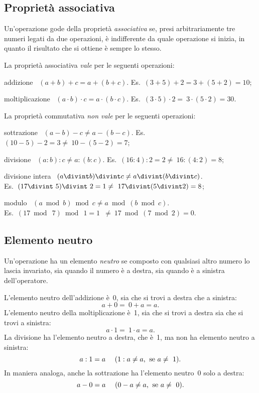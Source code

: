 \subsection{Proprietà associativa}
Un'operazione gode della proprietà \emph{associativa} se, presi arbitrariamente tre numeri legati da due operazioni,
è indifferente da quale operazione si inizia, in quanto il risultato che si ottiene è sempre lo stesso.

La proprietà associativa \emph{vale} per le seguenti operazioni:
\begin{description*}
 \item[addizione]~$(a+b)+c=a+(b+c)$. \quad Es.~$(3+5)+2=3+(5+2)=10$;
 \item[moltiplicazione]~$(a\cdot b)\cdot c=a\cdot (b\cdot c)$. \quad Es.~$(3\cdot 5)\cdot 2=~3\cdot(5\cdot 2)=30$.
\end{description*}

La proprietà commutativa \emph{non vale} per le seguenti operazioni:
\begin{description*}
 \item[sottrazione]~$(a-b)-c\neq a-(b-c)$. \quad Es.~$(10-5)-2=3\neq~10-(5-2)=7$;
 \item[divisione]~$(a:b):c\neq a:(b:c)$. \quad Es.~$(16:4):2=2\neq~16:(4:2)=8$;
 \item[divisione intera]~$(a\divint b)\divint c\neq a\divint(b\divint c)$. \\\quad Es.~$(17\divint~5)\divint~2=1\neq~17	\divint%
			 (5\divint2)=8$;
 \item[modulo]~$(a\bmod b)\bmod c\neq a\bmod(b\bmod c)$. \\\qquad Es.~$(17\bmod~7)\bmod~1=1$~$\neq~17\bmod(7\bmod2)=0$.
\end{description*}

\subsection{Elemento neutro}
Un'operazione ha un elemento \emph{neutro} se composto con qualsiasi altro numero lo lascia invariato, sia quando
il numero è a destra, sia quando è a sinistra dell'operatore.

L'elemento neutro dell'addizione è~0, sia che si trovi a destra che a sinistra:
\[a+0=~0+a =a.\]
L'elemento neutro della moltiplicazione è~1, sia che si trovi a destra sia che si trovi a sinistra:
\[a\cdot 1 =~1\cdot a = a.\]
La divisione ha l'elemento neutro a destra, che è~1, ma non ha elemento neutro a sinistra:
\[a:1 = a \quad~(1:a\neq a\text{, \:se }a\neq~1).\]
In maniera analoga, anche la sottrazione ha l'elemento neutro~0 solo a destra:
\[a-0 = a \quad~(0-a\neq a\text{, \:se }a\neq~0).\]

